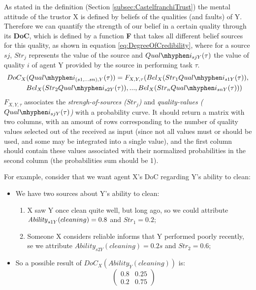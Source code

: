 As stated in the definition (Section \ref{subsec:CastelfranchiTrust}) the mental attitude of the trustor X is defined by beliefs of the qualities (and faults) of Y. Therefore we can quantify the strength of our belief in a certain quality through its \textbf{\ac{DoC}}, which is defined by a function \textbf{F} that takes all different belief sources for this quality, as shown in equation \ref{eq:DegreeOfCredibility}, where for a source $sj$, $Str_j$ represents the value of the source and $Qual\mhyphen i_{sjY}(\tau)$ the value of quality $i$ of agent Y provided by the source in performing task $\tau$. 
\begin{equation}
\begin {aligned}
DoC_X&(Qual\mhyphen i_{(s1, ...sn), Y} (\tau)) = F_{X, Y, \tau} (Bel_X(Str_1 Qual\mhyphen i_{s1Y}(\tau)), \\
&Bel_X(Str_2 Qual\mhyphen i_{s2Y}(\tau)), ..., Bel_X(Str_n Qual\mhyphen i_{snY}(\tau))) \\
\end {aligned}
\label{eq:DegreeOfCredibility}
\end{equation}
$F_{X, Y, \tau}$ associates the \textit{strengh-of-sources ($Str_j$)} and \textit{quality-values ($Qual\mhyphen i_{sjY}(\tau)$)} with a probability curve. It should return a matrix with two columns, with an amount of rows corresponding to the number of quality values selected out of the received as input (since not all values must or should be used, and some may be integrated into a single value), and the first column should contain these values associated with their normalized probabilities in the second column (the probabilities sum should be 1). 

For example, consider that we want agent X's \ac{DoC} regarding Y's ability to clean:
\begin{itemize}
    \item We have two sources about Y's ability to clean:
    \begin{enumerate}
        \item X saw Y once clean quite well, but long ago, so we could attribute $\text{\textit{Ability}}_{s1Y}(cleaning) = 0.8$ and $Str_1=0.2$;
        \item Someone X considers reliable informs that Y performed poorly recently, se we attribute
        $Ability_{s2Y}(cleaning) = 0.2s$ and $Str_2=0.6$;
    \end{enumerate}
    \item So a possible result of $DoC_X(Ability_Y (cleaning))$ is:
    $$\begin{pmatrix}
    0.8 & 0.25 \\
    0.2 & 0.75
    \end{pmatrix}$$
\end{itemize} 


